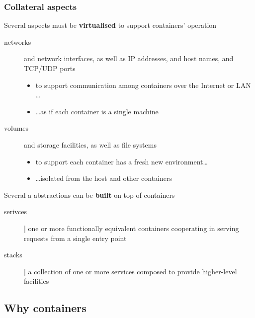 \documentclass[presentation]{beamer}\mode<presentation>{\usetheme{AMSBolognaFC}}
\begin{document}
\begin{frame}[allowframebreaks]
    \frametitle{Collateral aspects}

    \begin{block}{Several aspects must be \textbf{virtualised} to support containers' operation}
        \begin{description}
            \item[networks] and \alert{network interfaces}, as well as IP addresses, and host names, and TCP/UDP ports
            \begin{itemize}\small
                \item to support communication among containers over the Internet or LAN \dots
                \item \ldots as if each container is a single machine
            \end{itemize}

            \item[volumes] and \alert{storage facilities}, as well as file systems
            \begin{itemize}\small
                \item to support each container has a fresh new environment\ldots
                \item \ldots isolated from the host and other containers
            \end{itemize}
        \end{description}
    \end{block}

    \begin{block}{Several a abstractions can be \textbf{built} on top of containers}
        \begin{description}
            \item[serivces] | one or more functionally equivalent containers cooperating in serving requests from a single entry point

            \item[stacks] | a collection of one or more services composed to provide higher-level facilities
        \end{description}
    \end{block}

\end{frame}

\subsection{Why containers}
\end{document}
